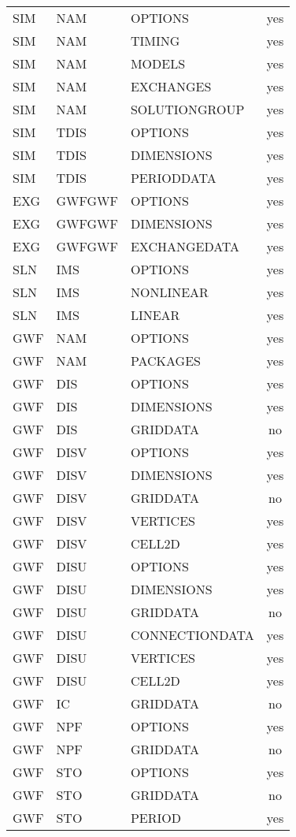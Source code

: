 \begin{longtable}{p{1.5cm} p{1.5cm} p{3cm} c}
\hline
SIM & NAM & OPTIONS & yes \\ 
SIM & NAM & TIMING & yes \\ 
SIM & NAM & MODELS & yes \\ 
SIM & NAM & EXCHANGES & yes \\ 
SIM & NAM & SOLUTIONGROUP & yes \\ 
\hline
SIM & TDIS & OPTIONS & yes \\ 
SIM & TDIS & DIMENSIONS & yes \\ 
SIM & TDIS & PERIODDATA & yes \\ 
\hline
EXG & GWFGWF & OPTIONS & yes \\ 
EXG & GWFGWF & DIMENSIONS & yes \\ 
EXG & GWFGWF & EXCHANGEDATA & yes \\ 
\hline
SLN & IMS & OPTIONS & yes \\ 
SLN & IMS & NONLINEAR & yes \\ 
SLN & IMS & LINEAR & yes \\ 
\hline
GWF & NAM & OPTIONS & yes \\ 
GWF & NAM & PACKAGES & yes \\ 
\hline
GWF & DIS & OPTIONS & yes \\ 
GWF & DIS & DIMENSIONS & yes \\ 
GWF & DIS & GRIDDATA & no \\ 
\hline
GWF & DISV & OPTIONS & yes \\ 
GWF & DISV & DIMENSIONS & yes \\ 
GWF & DISV & GRIDDATA & no \\ 
GWF & DISV & VERTICES & yes \\ 
GWF & DISV & CELL2D & yes \\ 
\hline
GWF & DISU & OPTIONS & yes \\ 
GWF & DISU & DIMENSIONS & yes \\ 
GWF & DISU & GRIDDATA & no \\ 
GWF & DISU & CONNECTIONDATA & yes \\ 
GWF & DISU & VERTICES & yes \\ 
GWF & DISU & CELL2D & yes \\ 
\hline
GWF & IC & GRIDDATA & no \\ 
\hline
GWF & NPF & OPTIONS & yes \\ 
GWF & NPF & GRIDDATA & no \\ 
\hline
GWF & STO & OPTIONS & yes \\ 
GWF & STO & GRIDDATA & no \\ 
GWF & STO & PERIOD & yes \\ 

\end{longtable}

